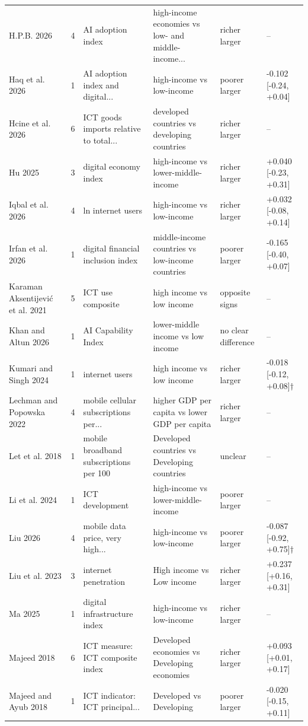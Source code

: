 {\begin{longtable}{@{}p{3.0cm} p{0.4cm} p{3.3cm} p{3.7cm} p{1.8cm} p{2.9cm}@{}}
H.P.B. 2026 & 4 & AI adoption index & high-income economies vs low- and middle-income... & richer larger & --\\
Haq et al. 2026 & 1 & AI adoption index and digital... & high-income vs low-income & poorer larger & -0.102 [-0.24, +0.04]\\
Hcine et al. 2026 & 6 & ICT goods imports relative to total... & developed countries vs developing countries & richer larger & --\\
Hu 2025 & 3 & digital economy index & high-income vs lower-middle-income & richer larger & +0.040 [-0.23, +0.31]\\
Iqbal et al. 2026 & 4 & ln internet users & high-income vs low-income & richer larger & +0.032 [-0.08, +0.14]\\
Irfan et al. 2026 & 1 & digital financial inclusion index & middle-income countries vs low-income countries & poorer larger & -0.165 [-0.40, +0.07]\\
Karaman Aksentijević et al. 2021 & 5 & ICT use composite & high income vs low income & opposite signs & --\\
Khan and Altun 2026 & 1 & AI Capability Index & lower-middle income vs low income & no clear difference & --\\
Kumari and Singh 2024 & 1 & internet users & high income vs low income & richer larger & -0.018 [-0.12, +0.08]$\dagger$\\
Lechman and Popowska 2022 & 4 & mobile cellular subscriptions per... & higher GDP per capita vs lower GDP per capita & richer larger & --\\
Let et al. 2018 & 1 & mobile broadband subscriptions per 100 & Developed countries vs Developing countries & unclear & --\\
Li et al. 2024 & 1 & ICT development & high-income vs lower-middle-income & poorer larger & --\\
Liu 2026 & 4 & mobile data price, very high... & high-income vs low-income & poorer larger & -0.087 [-0.92, +0.75]$\dagger$\\
Liu et al. 2023 & 3 & internet penetration & High income vs Low income & richer larger & +0.237 [+0.16, +0.31]\\
Ma 2025 & 1 & digital infrastructure index & high-income vs low-income & richer larger & --\\
Majeed 2018 & 6 & ICT measure: ICT composite index & Developed economies vs Developing economies & richer larger & +0.093 [+0.01, +0.17]\\
Majeed and Ayub 2018 & 1 & ICT indicator: ICT principal... & Developed vs Developing & poorer larger & -0.020 [-0.15, +0.11]\\

\end{longtable}}

